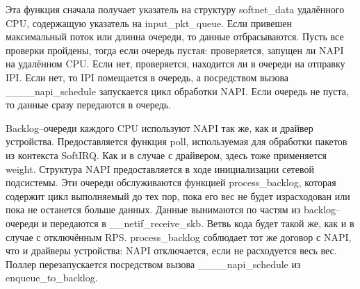Эта функция сначала получает указатель на структуру softnet\_data удалённого CPU, содержащую указатель на input\_pkt\_queue. Если привешен максимальный поток или длинна очереди, то данные отбрасываются. Пусть все проверки пройдены, тогда если очередь пустая: проверяется, запущен ли NAPI на удалённом CPU. Если нет, проверяется, находится ли в очереди на отправку IPI. Если нет, то IPI помещается в очередь, а посредством вызова \_\_\_\_napi\_schedule запускается цикл обработки NAPI. Если очередь не пуста, то данные сразу передаются в очередь.

Backlog--очереди каждого CPU используют NAPI так же, как и драйвер устройства. Предоставляется функция poll, используемая для обработки пакетов из контекста SoftIRQ. Как и в случае с драйвером, здесь тоже применяется weight. Структура NAPI предоставляется в ходе инициализации сетевой подсистемы. Эти очереди обслуживаются функцией process\_backlog, которая содержит цикл выполняемый до тех пор, пока его вес не будет израсходован или пока не останется больше данных. Данные вынимаются по частям из backlog--очереди и передаются в \_\_netif\_receive\_skb. Ветвь кода будет такой же, как и в случае с отключённым RPS. process\_backlog соблюдает тот же договор с NAPI, что и драйверы устройства: NAPI отключается, если не расходуется весь вес. Поллер перезапускается посредством вызова \_\_\_\_napi\_schedule из enqueue\_to\_backlog.